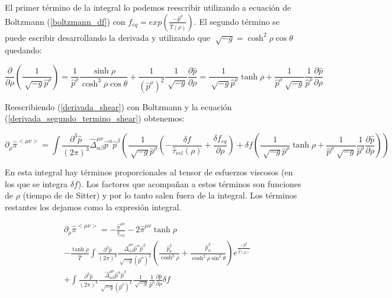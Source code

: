 \documentclass[11pt,a4paper]{article}
\begin{document}
El primer término de la integral lo podemos reescribir utilizando a ecuación de Boltzmann (\ref{boltzmann_df}) con $f_{eq}=exp({\frac{-\hat{p}^{\rho}}{\hat{T}(\rho)}})$. El segundo término se puede escribir desarrollando la derivada y utilizando que $\sqrt[]{-g}=\cosh^2\rho\cos\theta$ quedando:

\begin{equation}
\frac{\partial}{\partial\rho}(\frac{1}{\sqrt[]{-g}\hat{p}^{\rho}})=\frac{1}{\hat{p}^{\rho}}\frac{\sinh\rho}{\cosh^3\rho\cos\theta}+\frac{1}{(\hat{p}^{\rho})^2}\frac{1}{\sqrt[]{-g}}\frac{\partial\hat{p}}{\partial\rho}=
\frac{1}{\sqrt[]{-g}\hat{p}^{\rho}}\tanh\rho+\frac{1}{\hat{p}^{\rho}\sqrt[]{-g}}\frac{1}{\hat{p}^\rho}\frac{\partial\hat{p}}{\partial\rho}
\label{derivada_segundo_termino_shear}
\end{equation}


Reescribiendo (\ref{derivada_shear}) con Boltzmann y la ecuación (\ref{derivada_segundo_termino_shear}) obtenemos:


\begin{equation}
\partial_{\rho}\hat{\pi}^{<{\mu}{\nu}>}=
\int{\frac{\partial^3\hat{p}}{(2\pi)^3}}\hat{\Delta}^{{\mu}{\nu}}_{{\alpha}{\beta}}\hat{p}^{\alpha}\hat{p}^{\beta}(\frac{1}{\sqrt[]{-g}\hat{p}^{\rho}}(-\frac{\delta{f}}{\hat{\tau}_{rel}(\rho)}+\frac{\delta{f}_{eq}}{\partial\rho})
+\delta{f}(\frac{1}{\sqrt[]{-g}\hat{p}^{\rho}}\tanh\rho+\frac{1}{\hat{p}^{\rho}\sqrt[]{-g}}\frac{1}{\hat{p}^\rho}\frac{\partial\hat{p}}{\partial\rho}))
\label{derivada_shear_desarrollada}
\end{equation}

En esta integral hay términos proporcionales al tensor de esfuerzos viscosos (en los que se integra $\delta{f}$). Los factores que acompañan a estos términos son funciones de $\rho$ (tiempo de de Sitter) y por lo tanto salen fuera de la integral. Los términos restantes los dejamos como la expresión integral.


\begin{eqnarray}
&\partial_{\rho}\hat{\pi}^{<{\mu}{\nu}>}=-\frac{\hat{\pi}^{{\mu}{\nu}}}{\hat{\tau}_{rel}}-2\hat{\pi}^{{\mu}{\nu}}\tanh\rho\nonumber\\
&-\frac{\tanh\rho}{\hat{T}}\int{\frac{\partial^3\hat{p}}{(2\pi)^3}}\frac{\hat{\Delta}^{{\mu}{\nu}}_{{\alpha}{\beta}}\hat{p}^{\alpha}\hat{p}^{\beta}}{{\sqrt[]{-g}(\hat{p}^{\rho})^2}}(\frac{\hat{p}_{\theta}^2}{\cosh^2\rho}+\frac{\hat{p}_{\phi}^2}{\cosh^2\rho\sin^2\theta})e^{\frac{-\hat{p}^{\rho}}{\hat{T}(\rho)}}\nonumber\\
&+\int{\frac{\partial^3\hat{p}}{(2\pi)^3}}\frac{\hat{\Delta}^{{\mu}{\nu}}_{{\alpha}{\beta}}\hat{p}^{\alpha}\hat{p}^{\beta}}{{\sqrt[]{-g}(\hat{p}^{\rho})^2}}\frac{1}{\sqrt[]{-g}}\frac{1}{\hat{p}^\rho}\frac{\partial\hat{p}}{\partial\rho}\delta{f}
\label{shear_con_integrales}
\end{eqnarray}
\end{document}
